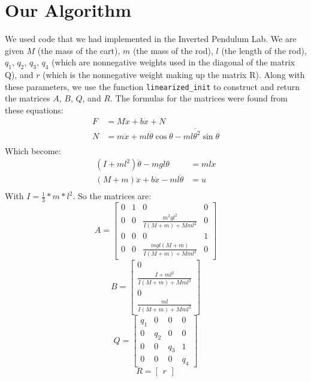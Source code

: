 \documentclass{hitec}
\begin{document}
	\section{Our Algorithm}
	We used code that we had implemented in the Inverted Pendulum Lab. We are given $M$ (the mass of the cart), $m$ (the mass of the rod), $l$ (the length of the rod), $q_1$, $q_2$, $q_3$, $q_4$ (which are nonnegative weights used in the diagonal of the matrix Q), and $r$ (which is the nonnegative weight making up the matrix R). Along with these parameters, we use the function \texttt{linearized\_init} to construct and return the matrices $A$, $B$, $Q$, and $R$.
	The formulas for the matrices were found from these equations:
	\begin{align}
	F&=M\ddot{x}+b\dot{x}+N                                  \\
	N&=m\ddot{x}+ ml\ddot{\theta}\cos{\theta}-ml\dot{\theta^2}\sin{\theta} \\
	\end{align}
	Which become:
	\begin{align}
	(I + ml^2)\ddot{\theta}-mgl\theta&=ml\ddot{x} \\
	(M+m)\ddot{x}+b\dot{x}-ml\ddot{\theta}&=u     \\
	\end{align}
	With $I=\frac{1}{3}*m*l^2$. So the matrices are:
	\[
	A=
	\begin{bmatrix}
	0 & 1 & 0                              & 0 \\
	0 & 0 & \frac{m^2gl^2}{I(M+m)+Mml^2}  & 0 \\
	0 & 0 & 0                              & 1 \\
	0 & 0 & \frac{mgl(M+m)}{I(M+m)+Mml^2}  & 0
	\end{bmatrix}
	\]
	\[
	B=
	\begin{bmatrix}
	0                           \\
	\frac{I+ml^2}{I(M+m)+Mml^2} \\
	0                           \\
	\frac{ml}{I(M+m)+Mml^2}
	\end{bmatrix}
	\]
	\[
	Q=
	\begin{bmatrix}
	q_1 & 0   & 0   & 0 \\
	0   & q_2 & 0   & 0 \\
	0   & 0   & q_3 & 1 \\
	0   & 0   & 0   & q_4
	\end{bmatrix}
	\]
	\[
	R=
	\begin{bmatrix}
	r
	\end{bmatrix}
	\]
\end{document}
